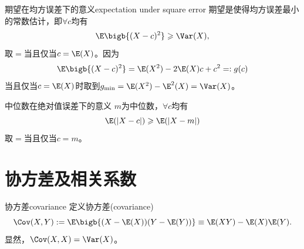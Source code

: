 
\begin{example}{期望在均方误差下的意义}{expectation under square error}
	期望是使得均方误差最小的常数估计，即$\forall c$均有
	\[
		\E\bigb{(X-c)^2}\geqslant\Var(X),
	\]
	取$=$当且仅当$c=\E(X)$。因为
	\begin{equation*}
		\E\bigb{(X-c)^2}=\E(X^2)-2\E(X)c+c^2=:g(c)
	\end{equation*}
	当且仅当$c=\E(X)$时取到$g_{\mathrm{min}}=\E(X^2)-\E^2(X)=\Var(X)$。
\end{example}
\begin{example}{中位数在绝对值误差下的意义}{}
	$m$为中位数，$\forall c$均有
	\[
		\E(|X-c|)\geqslant\E(|X-m|)
	\]
	取$=$当且仅当$c=m$。
\end{example}
\section{协方差及相关系数}
\begin{definition}{协方差}{covariance}
	定义协方差(covariance)
	\begin{equation}
		\Cov(X,Y):=\E\bigb{(X-\E(X))(Y-\E(Y))}\equiv\E(XY)-\E(X)\E(Y).
	\end{equation}
	显然，$\Cov(X,X)=\Var(X)$。
\end{definition}

